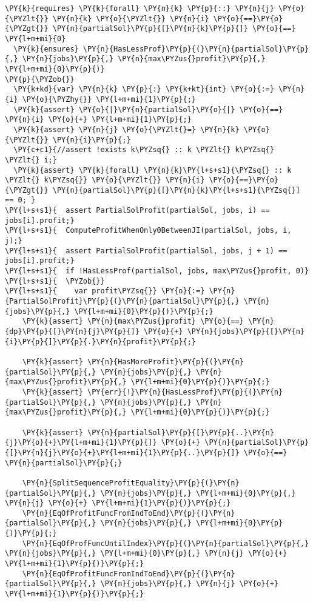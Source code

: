 \begin{Verbatim}[commandchars=\\\{\},fontsize=\footnotesize]
  \PY{k}{requires} \PY{k}{forall} \PY{n}{k} \PY{p}{::} \PY{n}{j} \PY{o}{\PYZlt{}} \PY{n}{k} \PY{o}{\PYZlt{}} \PY{n}{i} \PY{o}{==}\PY{o}{\PYZgt{}} \PY{n}{partialSol}\PY{p}{[}\PY{n}{k}\PY{p}{]} \PY{o}{==} \PY{l+m+mi}{0}
  \PY{k}{ensures} \PY{n}{HasLessProf}\PY{p}{(}\PY{n}{partialSol}\PY{p}{,} \PY{n}{jobs}\PY{p}{,} \PY{n}{max\PYZus{}profit}\PY{p}{,} \PY{l+m+mi}{0}\PY{p}{)}
\PY{p}{\PYZob{}}
  \PY{k+kd}{var} \PY{n}{k} \PY{p}{:} \PY{k+kt}{int} \PY{o}{:=} \PY{n}{i} \PY{o}{\PYZhy{}} \PY{l+m+mi}{1}\PY{p}{;}
  \PY{k}{assert} \PY{o}{|}\PY{n}{partialSol}\PY{o}{|} \PY{o}{==} \PY{n}{i} \PY{o}{+} \PY{l+m+mi}{1}\PY{p}{;}
  \PY{k}{assert} \PY{n}{j} \PY{o}{\PYZlt{}=} \PY{n}{k} \PY{o}{\PYZlt{}} \PY{n}{i}\PY{p}{;}
  \PY{c+c1}{//assert !exists k\PYZsq{} :: k \PYZlt{} k\PYZsq{} \PYZlt{} i;}
  \PY{k}{assert} \PY{k}{forall} \PY{n}{k}\PY{l+s+s1}{\PYZsq{} :: k \PYZlt{} k\PYZsq{}} \PY{o}{\PYZlt{}} \PY{n}{i} \PY{o}{==}\PY{o}{\PYZgt{}} \PY{n}{partialSol}\PY{p}{[}\PY{n}{k}\PY{l+s+s1}{\PYZsq{}] == 0; }
\PY{l+s+s1}{  assert PartialSolProfit(partialSol, jobs, i) == jobs[i].profit;}
\PY{l+s+s1}{  ComputeProfitWhenOnly0BetweenJI(partialSol, jobs, i, j);}
\PY{l+s+s1}{  assert PartialSolProfit(partialSol, jobs, j + 1) == jobs[i].profit;}
\PY{l+s+s1}{  if !HasLessProf(partialSol, jobs, max\PYZus{}profit, 0)}
\PY{l+s+s1}{  \PYZob{}}
\PY{l+s+s1}{    var profit\PYZsq{}} \PY{o}{:=} \PY{n}{PartialSolProfit}\PY{p}{(}\PY{n}{partialSol}\PY{p}{,} \PY{n}{jobs}\PY{p}{,} \PY{l+m+mi}{0}\PY{p}{)}\PY{p}{;}
    \PY{k}{assert} \PY{n}{max\PYZus{}profit} \PY{o}{==} \PY{n}{dp}\PY{p}{[}\PY{n}{j}\PY{p}{]} \PY{o}{+} \PY{n}{jobs}\PY{p}{[}\PY{n}{i}\PY{p}{]}\PY{p}{.}\PY{n}{profit}\PY{p}{;}

    \PY{k}{assert} \PY{n}{HasMoreProfit}\PY{p}{(}\PY{n}{partialSol}\PY{p}{,} \PY{n}{jobs}\PY{p}{,} \PY{n}{max\PYZus{}profit}\PY{p}{,} \PY{l+m+mi}{0}\PY{p}{)}\PY{p}{;}
    \PY{k}{assert} \PY{err}{!}\PY{n}{HasLessProf}\PY{p}{(}\PY{n}{partialSol}\PY{p}{,} \PY{n}{jobs}\PY{p}{,} \PY{n}{max\PYZus{}profit}\PY{p}{,} \PY{l+m+mi}{0}\PY{p}{)}\PY{p}{;}

    \PY{k}{assert} \PY{n}{partialSol}\PY{p}{[}\PY{p}{..}\PY{n}{j}\PY{o}{+}\PY{l+m+mi}{1}\PY{p}{]} \PY{o}{+} \PY{n}{partialSol}\PY{p}{[}\PY{n}{j}\PY{o}{+}\PY{l+m+mi}{1}\PY{p}{..}\PY{p}{]} \PY{o}{==} \PY{n}{partialSol}\PY{p}{;}
    
    \PY{n}{SplitSequenceProfitEquality}\PY{p}{(}\PY{n}{partialSol}\PY{p}{,} \PY{n}{jobs}\PY{p}{,} \PY{l+m+mi}{0}\PY{p}{,} \PY{n}{j} \PY{o}{+} \PY{l+m+mi}{1}\PY{p}{)}\PY{p}{;}
    \PY{n}{EqOfProfitFuncFromIndToEnd}\PY{p}{(}\PY{n}{partialSol}\PY{p}{,} \PY{n}{jobs}\PY{p}{,} \PY{l+m+mi}{0}\PY{p}{)}\PY{p}{;}
    \PY{n}{EqOfProfFuncUntilIndex}\PY{p}{(}\PY{n}{partialSol}\PY{p}{,} \PY{n}{jobs}\PY{p}{,} \PY{l+m+mi}{0}\PY{p}{,} \PY{n}{j} \PY{o}{+} \PY{l+m+mi}{1}\PY{p}{)}\PY{p}{;}
    \PY{n}{EqOfProfitFuncFromIndToEnd}\PY{p}{(}\PY{n}{partialSol}\PY{p}{,} \PY{n}{jobs}\PY{p}{,} \PY{n}{j} \PY{o}{+} \PY{l+m+mi}{1}\PY{p}{)}\PY{p}{;}


\end{Verbatim}
